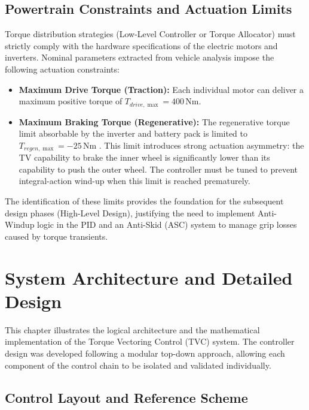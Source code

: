 \documentclass[12pt]{report}
\begin{document}
\section{Powertrain Constraints and Actuation Limits}
\label{sec:powertrain_constraints}

Torque distribution strategies (Low-Level Controller or Torque Allocator) must strictly comply with the hardware specifications of the electric motors and inverters. Nominal parameters extracted from vehicle analysis impose the following actuation constraints:

\begin{itemize}
  \item \textbf{Maximum Drive Torque (Traction):} Each individual motor can deliver a maximum positive torque of $T_{drive,\max} = 400\,\mathrm{Nm}$.

  \item \textbf{Maximum Braking Torque (Regenerative):} The regenerative torque limit absorbable by the inverter and battery pack is limited to $T_{regen,\max} = -25\,\mathrm{Nm}$ . This limit introduces strong actuation asymmetry: the TV capability to brake the inner wheel is significantly lower than its capability to push the outer wheel. The controller must be tuned to prevent integral-action wind-up when this limit is reached prematurely.
\end{itemize}

The identification of these limits provides the foundation for the subsequent design phases (High-Level Design), justifying the need to implement Anti-Windup logic in the PID and an Anti-Skid (ASC) system to manage grip losses caused by torque transients.

\chapter{System Architecture and Detailed Design}
\label{chap:system_architecture}

This chapter illustrates the logical architecture and the mathematical implementation of the Torque Vectoring Control (TVC) system. The controller design was developed following a modular top-down approach, allowing each component of the control chain to be isolated and validated individually.

\section{Control Layout and Reference Scheme}
\label{sec:control_layout_reference_scheme}
\end{document}
